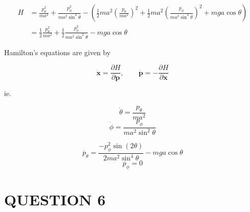 \documentclass[a4paper]{article}
\begin{document}
\begin{align*}
H & = \frac{p_{\theta}^{2}}{ma^{2}} +  \frac{p_{\phi}^{2}}{ma^{2}\sin^{2}\theta } - \left(  \frac{1}{2} m a^{2} \left(  \frac{p_{\theta}}{ma^{2}}\right)^{2}   + \frac{1}{2} m a^{2} \left( \frac{p_{\phi}}{ma^{2}\sin^{2}\theta } \right)^{2}  + mga \cos \theta  \right)    \\
& =  \frac{1}{2} \frac{p_{\theta}^{2}}{ma^{2}} + \frac{1}{2} \frac{p_{\phi}^{2}}{ma^{2}\sin^{2}\theta } -mga \cos \theta
\end{align*}

Hamilton's equations are given by

\[ \dot{\mathbf{x}} = \frac{\partial H }{\partial \mathbf{p}}, \qquad \dot{\mathbf{p}} = - \frac{\partial H }{\partial \mathbf{x}}   \]

ie.

\[ \dot{\theta}  = \frac{p_{\theta}}{ma^{2}} \]
\[ \dot{\phi}  = \frac{p_{\phi}}{ma^{2} \sin^{2} \theta } \]

\[ \dot{p_{\theta}} = \frac{-p_{\phi}^{2} \sin(2\theta) }{2 ma^{2} \sin^{4} \theta}  - mga \cos \theta \]
\[ \dot{p_{\phi}} = 0 \]

\section{QUESTION 6}
\end{document}
